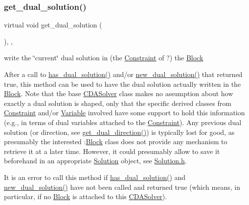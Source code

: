 \subsubsection{\texorpdfstring{get\+\_\+dual\+\_\+solution()}{get\_dual\_solution()}}
{\footnotesize\ttfamily virtual void get\+\_\+dual\+\_\+solution (\begin{DoxyParamCaption}\item[{void}]{ }\end{DoxyParamCaption})\hspace{0.3cm}{\ttfamily [inline]}, {\ttfamily [override]}, {\ttfamily [virtual]}}



write the \char`\"{}current\char`\"{} dual solution in (the \mbox{\hyperlink{class_s_m_spp__di__unipi__it_1_1_constraint}{Constraint}} of ?) the \mbox{\hyperlink{class_s_m_spp__di__unipi__it_1_1_block}{Block}} 

After a call to \mbox{\hyperlink{class_s_m_spp__di__unipi__it_1_1_m_c_f_solver_ac179f31ab4f3e55a7f03b152d065edbd}{has\+\_\+dual\+\_\+solution()}} and/or \mbox{\hyperlink{class_s_m_spp__di__unipi__it_1_1_m_c_f_solver_aa78ff49c515c8c6e2da6216d104dc219}{new\+\_\+dual\+\_\+solution()}} that returned true, this method can be used to have the dual solution actually written in the \mbox{\hyperlink{class_s_m_spp__di__unipi__it_1_1_block}{Block}}. Note that the base \mbox{\hyperlink{class_s_m_spp__di__unipi__it_1_1_c_d_a_solver}{C\+D\+A\+Solver}} class makes no assumption about how exactly a dual solution is shaped, only that the specific derived classes from \mbox{\hyperlink{class_s_m_spp__di__unipi__it_1_1_constraint}{Constraint}} and/or \mbox{\hyperlink{class_s_m_spp__di__unipi__it_1_1_variable}{Variable}} involved have some support to hold this information (e.\+g., in terms of dual variables attached to the \mbox{\hyperlink{class_s_m_spp__di__unipi__it_1_1_constraint}{Constraint}}). Any previous dual solution (or direction, see \mbox{\hyperlink{class_s_m_spp__di__unipi__it_1_1_m_c_f_solver_a20bea98e93ae37db17f0a0424be71987}{get\+\_\+dual\+\_\+direction()}}) is typically lost for good, as presumably the interested \+:\mbox{\hyperlink{class_s_m_spp__di__unipi__it_1_1_block}{Block}} class does not provide any mechanism to retrieve it at a later time. However, it could presumably allow to save it beforehand in an appropriate \mbox{\hyperlink{class_s_m_spp__di__unipi__it_1_1_solution}{Solution}} object, see \mbox{\hyperlink{_solution_8h}{Solution.\+h}}.

It is an error to call this method if \mbox{\hyperlink{class_s_m_spp__di__unipi__it_1_1_m_c_f_solver_ac179f31ab4f3e55a7f03b152d065edbd}{has\+\_\+dual\+\_\+solution()}} and \mbox{\hyperlink{class_s_m_spp__di__unipi__it_1_1_m_c_f_solver_aa78ff49c515c8c6e2da6216d104dc219}{new\+\_\+dual\+\_\+solution()}} have not been called and returned true (which means, in particular, if no \mbox{\hyperlink{class_s_m_spp__di__unipi__it_1_1_block}{Block}} is attached to this \mbox{\hyperlink{class_s_m_spp__di__unipi__it_1_1_c_d_a_solver}{C\+D\+A\+Solver}}).

